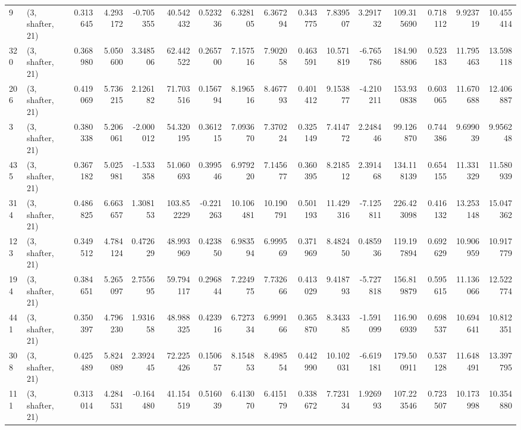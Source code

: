 \begin{tabular}{llrrrrrrrrrrrrrr}
9   &  (3, shafter, 21) &   0.313645 &   4.293172 &  -0.705355 &    40.542432 &   0.523236 &   6.328105 &   6.367294 &  0.343775 &   7.839507 &   3.291732 &   109.315690 &   0.718112 &   9.923719 &  10.455414 \\
320 &  (3, shafter, 21) &   0.368980 &   5.050600 &   3.348506 &    62.442522 &   0.265700 &   7.157516 &   7.902058 &  0.463591 &  10.571819 &  -6.765786 &   184.908806 &   0.523183 &  11.795463 &  13.598118 \\
206 &  (3, shafter, 21) &   0.419069 &   5.736215 &   2.126182 &    71.703516 &   0.156794 &   8.196516 &   8.467793 &  0.401412 &   9.153877 &  -4.210211 &   153.930838 &   0.603065 &  11.670688 &  12.406887 \\
3   &  (3, shafter, 21) &   0.380338 &   5.206061 &  -2.000012 &    54.320195 &   0.361215 &   7.093670 &   7.370224 &  0.325149 &   7.414772 &   2.248446 &    99.126870 &   0.744386 &   9.699039 &   9.956248 \\
435 &  (3, shafter, 21) &   0.367182 &   5.025981 &  -1.533358 &    51.060693 &   0.399546 &   6.979220 &   7.145677 &  0.360395 &   8.218512 &   2.391468 &   134.118139 &   0.654155 &  11.331329 &  11.580939 \\
314 &  (3, shafter, 21) &   0.486825 &   6.663657 &   1.308153 &   103.852229 &  -0.221263 &  10.106481 &  10.190791 &  0.501193 &  11.429316 &  -7.125811 &   226.423098 &   0.416132 &  13.253148 &  15.047362 \\
123 &  (3, shafter, 21) &   0.349512 &   4.784124 &   0.472629 &    48.993969 &   0.423850 &   6.983594 &   6.999569 &  0.371969 &   8.482450 &   0.485936 &   119.197894 &   0.692629 &  10.906959 &  10.917779 \\
194 &  (3, shafter, 21) &   0.384651 &   5.265097 &   2.755695 &    59.794117 &   0.296844 &   7.224975 &   7.732666 &  0.413029 &   9.418793 &  -5.727818 &   156.819879 &   0.595615 &  11.136066 &  12.522774 \\
441 &  (3, shafter, 21) &   0.350397 &   4.796230 &   1.931658 &    48.988325 &   0.423916 &   6.727334 &   6.999166 &  0.365870 &   8.343385 &  -1.591099 &   116.906939 &   0.698537 &  10.694641 &  10.812351 \\
308 &  (3, shafter, 21) &   0.425489 &   5.824089 &   2.392445 &    72.225426 &   0.150657 &   8.154853 &   8.498554 &  0.442990 &  10.102031 &  -6.619181 &   179.500911 &   0.537128 &  11.648491 &  13.397795 \\
111 &  (3, shafter, 21) &   0.313014 &   4.284531 &  -0.164480 &    41.154519 &   0.516039 &   6.413070 &   6.415179 &  0.338672 &   7.723134 &   1.926993 &   107.223546 &   0.723507 &  10.173998 &  10.354880 \\

\end{tabular}
